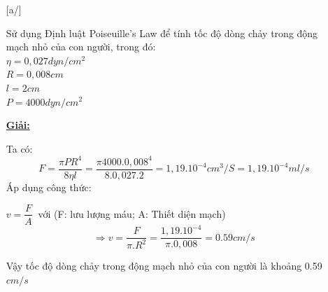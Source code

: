 \documentclass[12pt,a4paper]{article}
\begin{document}
\begin{enumerate} [a/]
\begin{flushleft}
		      Sử dụng Định luật Poiseuille’s Law để tính tốc độ dòng chảy trong động mạch nhỏ của con người, trong đó:
		      \\
		      $\eta = 0,027 dyn/cm^2$
		      \\
		      $R= 0,008 cm$
		      \\
		      $l= 2 cm$
		      \\
		      $P= 4000 dyn/cm^2$
	      \end{flushleft}
	      \begin{center}
		      \textbf{\underline{Giải:}}
	      \end{center}
	      \begin{flushleft}
		      Ta có:
		      $$F=\frac{\pi PR^4}{8\eta l}=\frac{\pi 4000.0,008^4}{8.0,027.2}=1,19.10^{-4} cm^3/S=1,19.10^{-4} ml/s$$
		      Áp dụng công thức:
	      \end{flushleft}
	      \begin{center}
		      $v=\dfrac{F}{A}\ $ với (F: lưu lượng máu; A: Thiết diện mạch)
		      $$\Rightarrow v=\frac{F}{\pi.R^2}=\frac{1,19.10^{-4}}{\pi . 0,008}=0.59 cm/s$$
	      \end{center}
	      \begin{flushleft}
		      Vậy tốc độ dòng chảy trong động mạch nhỏ của con người là khoảng 0.59 $cm/s$
	      \end{flushleft}
\end{enumerate}

\newpage
\end{document}
